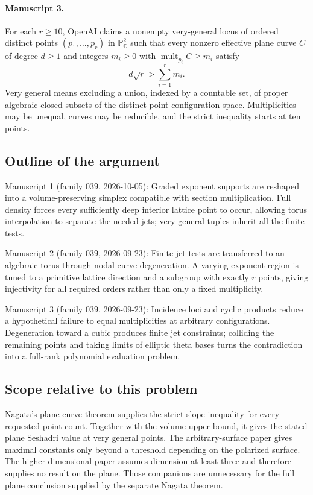\documentclass[11pt]{article}
\begin{document}
\paragraph{Manuscript 3.}
For each $r\ge10$, OpenAI claims a nonempty very-general locus of ordered distinct points $(p_1,\ldots,p_r)$ in $\mathbb P^2_{\mathbb C}$ such that every nonzero effective plane curve $C$ of degree $d\ge1$ and integers $m_i\ge0$ with $\operatorname{mult}_{p_i}C\ge m_i$ satisfy
\[
d\sqrt r>\sum_{i=1}^r m_i.
\]
Very general means excluding a union, indexed by a countable set, of proper algebraic closed subsets of the distinct-point configuration space. Multiplicities may be unequal, curves may be reducible, and the strict inequality starts at ten points.

\subsection{Outline of the argument}
Manuscript 1 (family 039, 2026-10-05): Graded exponent supports are reshaped into a volume-preserving simplex compatible with section multiplication. Full density forces every sufficiently deep interior lattice point to occur, allowing torus interpolation to separate the needed jets; very-general tuples inherit all the finite tests.

Manuscript 2 (family 039, 2026-09-23): Finite jet tests are transferred to an algebraic torus through nodal-curve degeneration. A varying exponent region is tuned to a primitive lattice direction and a subgroup with exactly $r$ points, giving injectivity for all required orders rather than only a fixed multiplicity.

Manuscript 3 (family 039, 2026-09-23): Incidence loci and cyclic products reduce a hypothetical failure to equal multiplicities at arbitrary configurations. Degeneration toward a cubic produces finite jet constraints; colliding the remaining points and taking limits of elliptic theta bases turns the contradiction into a full-rank polynomial evaluation problem.

\subsection{Scope relative to this problem}
Nagata's plane-curve theorem supplies the strict slope inequality for every requested point count. Together with the volume upper bound, it gives the stated plane Seshadri value at very general points. The arbitrary-surface paper gives maximal constants only beyond a threshold depending on the polarized surface. The higher-dimensional paper assumes dimension at least three and therefore supplies no result on the plane. Those companions are unnecessary for the full plane conclusion supplied by the separate Nagata theorem.
\end{document}
